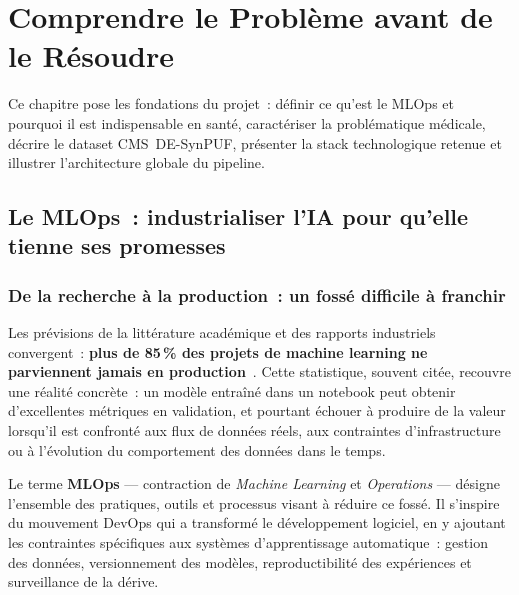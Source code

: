\chapter{Comprendre le Problème avant de le Résoudre}
\label{chap:contexte}

\begin{infobox}
Ce chapitre pose les fondations du projet~: définir ce qu'est le MLOps et
pourquoi il est indispensable en santé, caractériser la problématique médicale,
décrire le dataset CMS~DE-SynPUF, présenter la stack technologique retenue et
illustrer l'architecture globale du pipeline.
\end{infobox}

\section{Le MLOps~: industrialiser l'IA pour qu'elle tienne ses promesses}

\subsection{De la recherche à la production~: un fossé difficile à franchir}

Les prévisions de la littérature académique et des rapports industriels
convergent~: \textbf{plus de 85\,\% des projets de machine learning ne parviennent
jamais en production}~\cite{sculley2015hidden, zaharia2018accelerating}. Cette
statistique, souvent citée, recouvre une réalité concrète~: un modèle entraîné
dans un notebook peut obtenir d'excellentes métriques en validation, et pourtant
échouer à produire de la valeur lorsqu'il est confronté aux flux de données réels,
aux contraintes d'infrastructure ou à l'évolution du comportement des données dans
le temps.

Le terme \textbf{MLOps} --- contraction de \textit{Machine Learning} et
\textit{Operations} --- désigne l'ensemble des pratiques, outils et processus visant
à réduire ce fossé. Il s'inspire du mouvement DevOps qui a transformé le
développement logiciel, en y ajoutant les contraintes spécifiques aux systèmes
d'apprentissage automatique~: gestion des données, versionnement des modèles,
reproductibilité des expériences et surveillance de la dérive.

